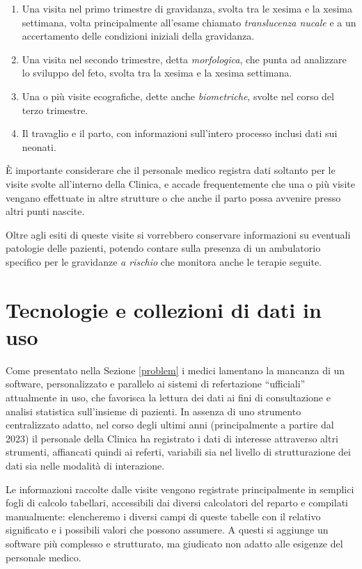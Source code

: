 \begin{enumerate}
\item Una visita nel primo trimestre di gravidanza, svolta tra le xesima e la xesima settimana, volta principalmente all'esame chiamato \emph{translucenza nucale} e a un accertamento delle condizioni iniziali della gravidanza.
\item Una visita nel secondo trimestre, detta \emph{morfologica}, che punta ad analizzare lo sviluppo del feto, svolta tra la xesima e la xesima settimana.
\item Una o più visite ecografiche, dette anche \emph{biometriche}, svolte nel corso del terzo trimestre.
\item Il travaglio e il parto, con informazioni sull'intero processo inclusi dati sui neonati.
\end{enumerate}

È importante considerare che il personale medico registra dati soltanto per le visite svolte all'interno della Clinica, e accade frequentemente che una o più visite vengano effettuate in altre strutture o che anche il parto possa avvenire presso altri punti nascite.

Oltre agli esiti di queste visite si vorrebbero conservare informazioni su eventuali patologie delle pazienti, potendo contare sulla presenza di un ambulatorio specifico per le gravidanze \emph{a rischio} che monitora anche le terapie seguite.

\section{Tecnologie e collezioni di dati in uso}
\label{usednow}

Come presentato nella Sezione \ref{problem} i medici lamentano la mancanza di un software, personalizzato e parallelo ai sistemi di refertazione \enquote{ufficiali} attualmente in uso, che favorisca la lettura dei dati ai fini di consultazione e analisi statistica sull'insieme di pazienti.
In assenza di uno strumento centralizzato adatto, nel corso degli ultimi anni (principalmente a partire dal 2023) il personale della Clinica ha registrato i dati di interesse attraverso altri strumenti, affiancati quindi ai referti, variabili sia nel livello di strutturazione dei dati sia nelle modalità di interazione.

Le informazioni raccolte dalle visite vengono registrate principalmente in semplici fogli di calcolo tabellari, accessibili dai diversi calcolatori del reparto e compilati manualmente: elencheremo i diversi campi di queste tabelle con il relativo significato e i possibili valori che possono assumere.
A questi si aggiunge un software più complesso e strutturato, ma giudicato non adatto alle esigenze del personale medico.

